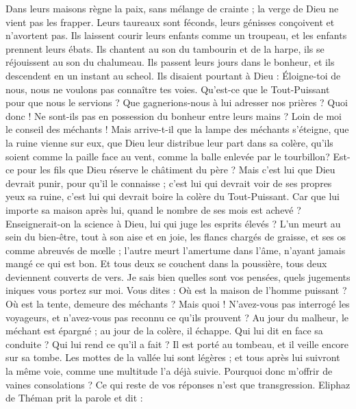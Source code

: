 \begin{multicols}{2}
Dans leurs maisons règne la paix, sans mélange de crainte ; la verge de Dieu ne vient pas les frapper.
Leurs taureaux sont féconds, leurs génisses conçoivent et n'avortent pas.
Ils laissent courir leurs enfants comme un troupeau, et les enfants prennent leurs ébats.
Ils chantent au son du tambourin et de la harpe, ils se réjouissent au son du chalumeau.
Ils passent leurs jours dans le bonheur, et ils descendent en un instant au scheol.
Ils disaient pourtant à Dieu : Éloigne-toi de nous, nous ne voulons pas connaître tes voies.
Qu'est-ce que le Tout-Puissant pour que nous le servions ? Que gagnerions-nous à lui adresser nos prières ?
Quoi donc ! Ne sont-ils pas en possession du bonheur entre leurs mains ? Loin de moi le conseil des méchants !
Mais arrive-t-il que la lampe des méchants s'éteigne, que la ruine vienne sur eux, que Dieu leur distribue leur part dans sa colère,
qu'ils soient comme la paille face au vent, comme la balle enlevée par le tourbillon?
Est-ce pour les fils que Dieu réserve le châtiment du père ? Mais c'est lui que Dieu devrait punir, pour qu'il le connaisse ;
c'est lui qui devrait voir de ses propres yeux sa ruine, c'est lui qui devrait boire la colère du Tout-Puissant.
Car que lui importe sa maison après lui, quand le nombre de ses mois est achevé ?
Enseignerait-on la science à Dieu, lui qui juge les esprits élevés ?
L'un meurt au sein du bien-être, tout à son aise et en joie,
les flancs chargés de graisse, et ses os comme abreuvés de mœlle ;
l'autre meurt l'amertume dans l'âme, n'ayant jamais mangé ce qui est bon.
Et tous deux se couchent dans la poussière, tous deux deviennent couverts de vers.
Je sais bien quelles sont vos pensées, quels jugements iniques vous portez sur moi.
Vous dites : Où est la maison de l'homme puissant ? Où est la tente, demeure des méchants ?
Mais quoi ! N'avez-vous pas interrogé les voyageurs, et n'avez-vous pas reconnu ce qu'ils prouvent ?
Au jour du malheur, le méchant est épargné ; au jour de la  colère, il échappe.
Qui lui dit en face sa conduite ? Qui lui rend ce qu'il a fait ?
Il est porté au tombeau, et il veille encore sur sa tombe.
Les mottes de la vallée lui sont légères ; et tous après lui suivront la même voie, comme une multitude l'a déjà suivie.
Pourquoi donc m'offrir de vaines consolations ? Ce qui reste de vos réponses n'est que transgression.
\VerseOne{}Eliphaz de Théman prit la parole et dit :

\end{multicols}
